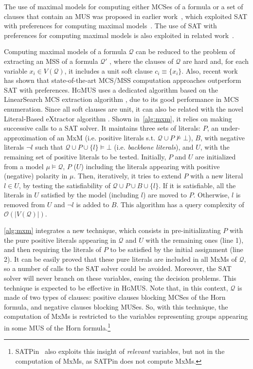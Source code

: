\documentclass{llncs}
\newcommand{\fml}[1]{{\mathcal{#1}}}
\DeclareMathOperator*{\nentails}{\nvDash}
\DeclareMathOperator*{\entails}{\vDash}
\begin{document}
The use of maximal models for computing either MCSes of a formula or a
set of clauses that contain an MUS was proposed in earlier
work~\cite{pms-aaai13}, which exploited SAT with preferences for
computing maximal
models~\cite{giunchiglia-ecai06,giunchiglia-aicomm13}.
The use of SAT with preferences for computing maximal models is also
exploited in related work~\cite{sebastiani-cade09,sebastiani-tr15}.


Computing maximal models of a formula $\fml{Q}$ can be reduced to the problem of 
extracting an MSS of a formula $\fml{Q}'$ \cite{mshjpb-ijcai13}, where the clauses of $\fml{Q}$ are hard and, for each variable $x_i \in V(\fml{Q})$, it includes a unit soft clause $c_i \equiv \{x_i\}$.
Also, recent work ~\cite{mshjpb-ijcai13,mazure-aaai14,bacchus-aaai14b,mpms-ijcai15} has shown that state-of-the-art MCS/MSS computation approaches outperform SAT with preferences.
\textsc{HgMUS} uses a dedicated algorithm based on the LinearSearch MCS extraction algorithm \cite{mshjpb-ijcai13}, due to its good performance in MCS enumeration. Since all soft clauses are unit, it can also be related with the novel Literal-Based eXtractor algorithm \cite{mpms-ijcai15}. Shown in~\autoref{alg:mxm}, it relies on making successive calls to a SAT solver. It maintains three sets of literals: $P$, an under-approximation of an MxM (i.e. positive literals s.t. $\fml{Q} \cup P \nentails \bot$), $B$, with negative literals $\lnot l$ such that $\fml{Q} \cup P \cup \{l\} \entails \bot$ (i.e. \textit{backbone literals}), and $U$, with the remaining set of positive literals to be tested. Initially, $P$ and $U$ are initialized from a model $\mu \entails \fml{Q}$, $P$ ($U$) including the literals appearing with positive (negative) polarity in $\mu$. Then, iteratively, it tries to extend $P$ with a new literal $l\in U$, by testing the satisfiability of $\fml{Q} \cup P \cup B \cup \{l\}$. If it is satisfiable, all the literals in $U$ satisfied by the model (including $l$) are moved to $P$. Otherwise, $l$ is removed from $U$ and $\lnot l$ is added to $B$. This algorithm has a query complexity of $\fml{O}(|V(\fml{Q})|)$. 

\autoref{alg:mxm} integrates a new technique, which consists in pre-initializating $P$ with the pure positive literals appearing in $\fml{Q}$ and $U$ with the remaining ones (line 1), and then requiring the literals of $P$ to be satisfied by the initial assignment (line 2). It can be easily proved that these pure literals are included in all MxMs of $\fml{Q}$, so a number of calls to the SAT solver could be avoided. Moreover, the SAT solver will never branch on these variables, easing the decision problems.
This technique is expected to be effective in \textsc{HgMUS}. Note that, in this context, $\fml{Q}$ is made of two types of clauses: positive clauses blocking MCSes of the Horn formula, and negative clauses blocking MUSes. So, with this technique, the computation of MxMs is restricted to the variables representing groups appearing in some MUS of the Horn formula.\footnote{SATPin~\cite{mp-tr15} also exploits this insight of \textit{relevant} variables, but not in the computation of MxMs, as SATPin does not compute MxMs.}
\end{document}
